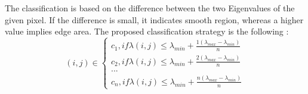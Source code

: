 \documentclass[draft,final]{vutinfth} %
\begin{document}
The classification is based on the difference between the two Eigenvalues of the given pixel.
If the difference is small, it indicates smooth region, whereas a higher value implies edge area.
The proposed classification strategy is the following \cite{zeng2011region}:
\begin{equation}
(i, j)\in \left\{
                \begin{array}{ll}
                  c_1, if \lambda(i,j) \leq \lambda_{min} + \frac{1(\lambda_{max} - \lambda_{min})}{n}\\
                  c_2, if \lambda(i,j) \leq \lambda_{min} + \frac{2(\lambda_{max} - \lambda_{min})}{n}\\
				... \\
                   c_n, if \lambda(i,j) \leq \lambda_{min} + \frac{n(\lambda_{max} - \lambda_{min})}{n}
                \end{array}
              \right.
\end{equation}
\end{document}
